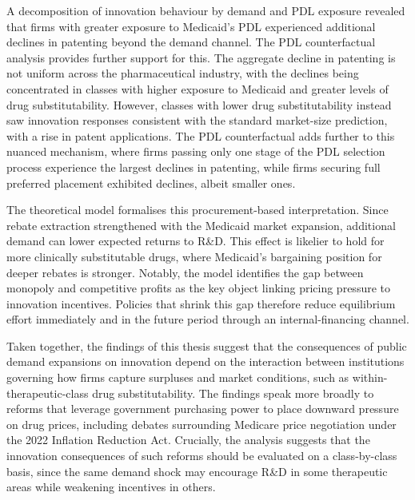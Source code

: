 \documentclass[12pt]{article}
\begin{document}
A decomposition of innovation behaviour by demand and PDL exposure revealed that firms with greater exposure to Medicaid's PDL experienced additional declines in patenting beyond the demand channel. The PDL counterfactual analysis provides further support for this. The aggregate decline in patenting is not uniform across the pharmaceutical industry, with the declines being concentrated in classes with higher exposure to Medicaid and greater levels of drug substitutability. However, classes with lower drug substitutability instead saw innovation responses consistent with the standard market-size prediction, with a rise in patent applications. The PDL counterfactual adds further to this nuanced mechanism, where firms passing only one stage of the PDL selection process experience the largest declines in patenting, while firms securing full preferred placement exhibited declines, albeit smaller ones.

The theoretical model formalises this procurement-based interpretation. Since rebate extraction strengthened with the Medicaid market expansion, additional demand can lower expected returns to R\&D. This effect is likelier to hold for more clinically substitutable drugs, where Medicaid's bargaining position for deeper rebates is stronger. Notably, the model identifies the gap between monopoly and competitive profits as the key object linking pricing pressure to innovation incentives. Policies that shrink this gap therefore reduce equilibrium effort immediately and in the future period through an internal-financing channel.

Taken together, the findings of this thesis suggest that the consequences of public demand expansions on innovation depend on the interaction between institutions governing how firms capture surpluses and market conditions, such as within-therapeutic-class drug substitutability. The findings speak more broadly to reforms that leverage government purchasing power to place downward pressure on drug prices, including debates surrounding Medicare price negotiation under the 2022 Inflation Reduction Act. Crucially, the analysis suggests that the innovation consequences of such reforms should be evaluated on a class-by-class basis, since the same demand shock may encourage R\&D in some therapeutic areas while weakening incentives in others.

\newpage


\end{document}
